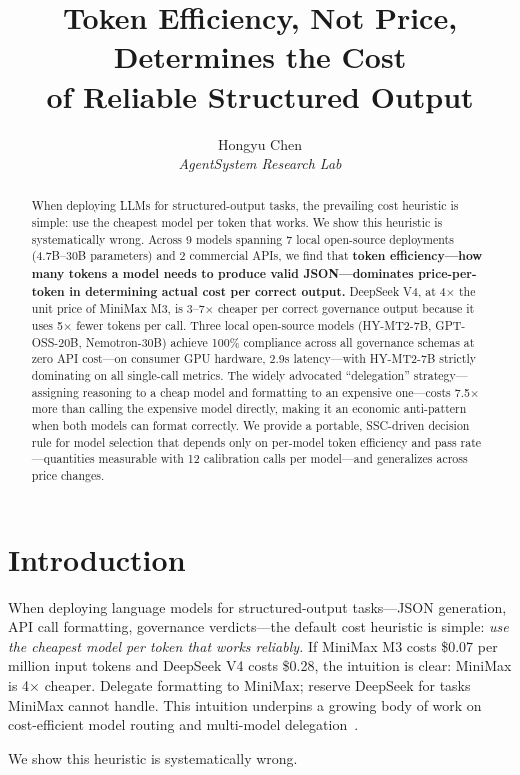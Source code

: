 \documentclass[11pt,a4paper]{article}
\title{\textbf{Token Efficiency, Not Price, Determines the Cost\\of Reliable Structured Output}}
\author{Hongyu Chen\\\textit{AgentSystem Research Lab}}
\date{}
\begin{document}
\sloppy\raggedbottom\maketitle

\begin{abstract}
When deploying LLMs for structured-output tasks, the prevailing cost heuristic is simple: use the cheapest model per token that works. We show this heuristic is systematically wrong. Across 9 models spanning 7 local open-source deployments (4.7B--30B parameters) and 2 commercial APIs, we find that \textbf{token efficiency---how many tokens a model needs to produce valid JSON---dominates price-per-token in determining actual cost per correct output.} DeepSeek V4, at 4$\times$ the unit price of MiniMax M3, is 3--7$\times$ cheaper per correct governance output because it uses 5$\times$ fewer tokens per call. Three local open-source models (HY-MT2-7B, GPT-OSS-20B, Nemotron-30B) achieve 100\% compliance across all governance schemas at zero API cost---on consumer GPU hardware, 2.9s latency---with HY-MT2-7B strictly dominating on all single-call metrics. The widely advocated ``delegation'' strategy---assigning reasoning to a cheap model and formatting to an expensive one---costs 7.5$\times$ more than calling the expensive model directly, making it an economic anti-pattern when both models can format correctly. We provide a portable, SSC-driven decision rule for model selection that depends only on per-model token efficiency and pass rate---quantities measurable with 12 calibration calls per model---and generalizes across price changes.
\end{abstract}

\section{Introduction}

When deploying language models for structured-output tasks---JSON generation, API call formatting, governance verdicts---the default cost heuristic is simple: \textit{use the cheapest model per token that works reliably.} If MiniMax M3 costs \$0.07 per million input tokens and DeepSeek V4 costs \$0.28, the intuition is clear: MiniMax is 4$\times$ cheaper. Delegate formatting to MiniMax; reserve DeepSeek for tasks MiniMax cannot handle. This intuition underpins a growing body of work on cost-efficient model routing and multi-model delegation~\cite{fable5harness,frugalgpt,routellm}.

We show this heuristic is systematically wrong.
\end{document}
